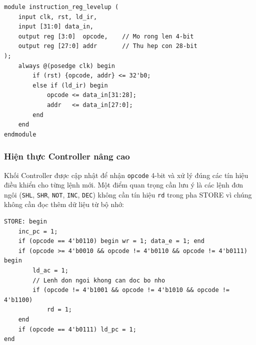 \begin{lstlisting}[caption=Mã nguồn Verilog cho Instruction Register nâng cao]
module instruction_reg_levelup (
    input clk, rst, ld_ir,
    input [31:0] data_in,
    output reg [3:0]  opcode,    // Mo rong len 4-bit
    output reg [27:0] addr       // Thu hep con 28-bit
);
    always @(posedge clk) begin
        if (rst) {opcode, addr} <= 32'b0;
        else if (ld_ir) begin
            opcode <= data_in[31:28];
            addr   <= data_in[27:0];
        end
    end
endmodule
\end{lstlisting}

\subsubsection{Hiện thực Controller nâng cao}
Khối Controller được cập nhật để nhận \texttt{opcode} 4-bit và xử lý đúng các tín hiệu điều khiển cho từng lệnh mới. Một điểm quan trọng cần lưu ý là các lệnh đơn ngôi (\texttt{SHL}, \texttt{SHR}, \texttt{NOT}, \texttt{INC}, \texttt{DEC}) không cần tín hiệu \texttt{rd} trong pha STORE vì chúng không cần đọc thêm dữ liệu từ bộ nhớ:

\begin{lstlisting}[caption=Trích đoạn logic pha STORE trong Controller nâng cao]
STORE: begin
    inc_pc = 1;
    if (opcode == 4'b0110) begin wr = 1; data_e = 1; end
    if (opcode >= 4'b0010 && opcode != 4'b0110 && opcode != 4'b0111) begin
        ld_ac = 1;
        // Lenh don ngoi khong can doc bo nho
        if (opcode != 4'b1001 && opcode != 4'b1010 && opcode != 4'b1100)
            rd = 1;
    end
    if (opcode == 4'b0111) ld_pc = 1;
end
\end{lstlisting}